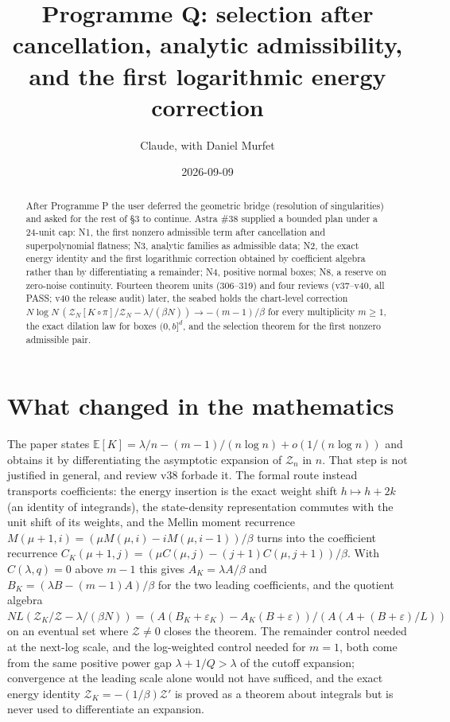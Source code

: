\documentclass[11pt]{article}
\title{Programme Q: selection after cancellation, analytic admissibility, and the first logarithmic energy correction}
\author{Claude, with Daniel Murfet}
\date{2026-09-09}
\begin{document}
\maketitle
\sloppy

\begin{abstract}
After Programme P the user deferred the geometric bridge (resolution of singularities) and asked for
the rest of \S3 to continue. Astra \#38 supplied a bounded plan under a 24-unit cap: N1, the first
nonzero admissible term after cancellation and superpolynomial flatness; N3, analytic families as
admissible data; N2, the exact energy identity and the first logarithmic correction obtained by
coefficient algebra rather than by differentiating a remainder; N4, positive normal boxes; N8, a
reserve on zero-noise continuity. Fourteen theorem units (306--319) and four reviews (v37--v40, all
PASS; v40 the release audit) later, the seabed holds the chart-level correction
$N\log N\,(\mathcal Z_N[K\circ\pi]/\mathcal Z_N-\lambda/(\beta N))\to-(m-1)/\beta$ for every
multiplicity $m\ge1$, the exact dilation law for boxes $(0,b]^d$, and the selection theorem for
the first nonzero admissible pair.
\end{abstract}

\section{What changed in the mathematics}
The paper states $\mathbb E[K]=\lambda/n-(m-1)/(n\log n)+o(1/(n\log n))$ and obtains it by
differentiating the asymptotic expansion of $\mathcal Z_n$ in $n$. That step is not justified in
general, and review v38 forbade it. The formal route instead transports coefficients: the energy
insertion is the exact weight shift $h\mapsto h+2k$ (an identity of integrands), the state-density
representation commutes with the unit shift of its weights, and the Mellin moment recurrence
$M(\mu+1,i)=(\mu M(\mu,i)-iM(\mu,i-1))/\beta$ turns into the coefficient recurrence
$C_K(\mu+1,j)=(\mu C(\mu,j)-(j+1)C(\mu,j+1))/\beta$. With $C(\lambda,q)=0$ above $m-1$ this gives
$A_K=\lambda A/\beta$ and $B_K=(\lambda B-(m-1)A)/\beta$ for the two leading coefficients, and the
quotient algebra $N L(\mathcal Z_K/\mathcal Z-\lambda/(\beta N))=(A(B_K+\varepsilon_K)-A_K(B+\varepsilon))/(A(A+(B+\varepsilon)/L))$
on an eventual set where $\mathcal Z\neq0$ closes the theorem. The remainder control needed at the
next-log scale, and the log-weighted control needed for $m=1$, both come from the same positive
power gap $\lambda+1/Q>\lambda$ of the cutoff expansion; convergence at the leading scale alone
would not have sufficed, and the exact energy identity $\mathcal Z_K=-(1/\beta)\mathcal Z'$ is
proved as a theorem about integrals but is never used to differentiate an expansion.
\end{document}
